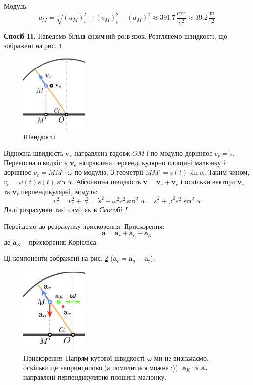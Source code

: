 \documentclass[12pt]{extarticle}
\begin{document}
Модуль:
\[
a_M = \sqrt{(a_M)_x^2 + (a_M)_y^2 + (a_M)_z^2} \approx 391.7 \, \frac{\text{cm}}{s^2} \approx 39.2 \, \frac{\text{m}}{\text{s}^2}
\]

\textbf{Спосіб II.} Наведемо більш фізичний розв'язок. Розглянемо швидкості, що зображені на рис. \ref{fig:3}.

\begin{figure}[H]
    \centering
    \includegraphics[width=0.3\textwidth]{images/test_1/fig_3.png}
    \caption{Швидкості}
    \label{fig:3}
\end{figure}

Відносна швидкість $\mathbf{v}_r$ направлена вздовж $OM$ і по модулю дорівнює $v_r=\dot{s}$. Переносна швидкість $\mathbf{v}_e$ направлена перпендикулярно площині малюнку і дорівнює $v_e=MM' \cdot \omega$ по модулю. З геометрії $MM' = s(t)\sin\alpha$. Таким чином, $v_e=\omega(t)s(t)\sin\alpha$. Абсолютна швидкість $\mathbf{v}=\mathbf{v}_e+\mathbf{v}_r$ і оскільки вектори $\mathbf{v}_e$ та $\mathbf{v}_r$ перпендикулярні, модуль:
\[
v^2 = v_e^2 + v_r^2 = \dot{s}^2 + \omega^2s^2\sin^2\alpha = \dot{s}^2 + \dot{\varphi}^2s^2\sin^2\alpha
\]
Далі розрахунки такі самі, як в \textit{Способі I}. 

Перейдемо до розрахунку прискорення. Прискорення:
\[
\mathbf{a} = \mathbf{a}_r + \mathbf{a}_e + \mathbf{a}_K
\]
де $\mathbf{a}_K$ -- прискорення Коріоліса. 

Ці компоненти зображені на рис. \ref{fig:4} ($\mathbf{a}_e=\mathbf{a}_n+\mathbf{a}_{\tau}$).

\begin{figure}[H]
    \centering
    \includegraphics[width=0.3\textwidth]{images/test_1/fig_4.png}
    \caption{Прискорення. Напрям кутової швидкості $\boldsymbol{\omega}$ ми не визначаємо, оскільки це непринципово (а помилитися можна :)). $\mathbf{a}_K$ та $\mathbf{a}_{\tau}$ направлені перпендикулярно площині малюнку.}
    \label{fig:4}
\end{figure}
\end{document}
